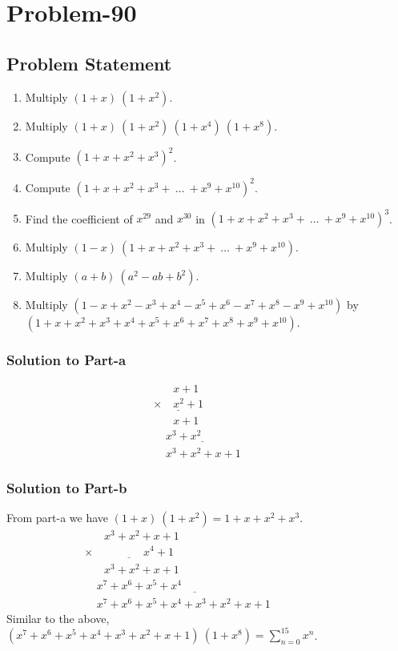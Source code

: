 \documentclass[12pt]{article}
\begin{document}
\section*{Problem-90}
\subsection*{Problem Statement}
\begin{enumerate}[label=(\alph*)]
\item Multiply $(1+x)\ \left(1+x^2\right)$.
\item Multiply $(1+x)\ \left(1+x^2\right)\ \left(1+x^4\right)\ \left(1+x^8\right)$.
\item Compute $\left( 1 + x + x^2 + x^3 \right)^2$.
\item Compute $\left( 1+x+x^2+x^3+\ \ldots\  +x^9+x^{10}\right)^2$.
\item Find the coefficient of $x^{29}$ and $x^{30}$ in $\left( 1+x+x^2+x^3+\ \ldots\ +x^9+x^{10} \right)^3$.
\item Multiply $(1-x)\ \left( 1+x+x^2+x^3+\ \ldots\ +x^9+x^{10} \right)$.
\item Multiply $(a+b)\ \left( a^2-ab+b^2 \right)$.
\item Multiply $\left( 1-x+x^2-x^3+x^4-x^5+x^6-x^7+x^8-x^9+x^{10} \right)$ by\\ $\left( 1+x+x^2+x^3+x^4+x^5+x^6+x^7+x^8+x^9+x^{10} \right)$.
\end{enumerate}

\subsubsection*{Solution to Part-a}
\begin{equation*}
	\begin{array}{c}
		\phantom{\times99}x+1\\
		\underline{\times\phantom{99} x^2+1}\\
		\phantom{\times99}x+1\\
		\underline{\phantom\times x^3+x^2\phantom{999999999}}\\
		\phantom\times x^3+x^2+x+1\phantom{9999}
	\end{array}
\end{equation*}

\subsubsection*{Solution to Part-b}
From part-a we have $(1+x)\ \left(1+x^2\right) = 1+x+x^2+x^3$.
\begin{equation*}
	\begin{array}{c}
		\phantom{\times99}x^3+x^2+x+1\\
		\underline{\times\phantom{999999999} x^4+1}\\
		\phantom{\times99}x^3+x^2+x+1\\
		\underline{\phantom\times x^7+x^6+x^5+x^4\phantom{9999999999999999999999}}\\
		\phantom\times x^7+x^6+x^5+x^4+x^3+x^2+x+1\phantom{99999999999}
	\end{array}
\end{equation*}
Similar to the above, $\left(x^7+x^6+x^5+x^4+x^3+x^2+x+1\right)\ \left(1+x^8\right) = \sum_{n=0}^{15}x^n$.
\end{document}
